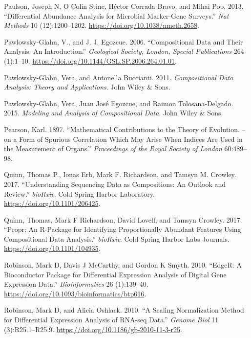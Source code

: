 \documentclass[onecolumn]{book}
\theoremstyle{definition}
\theoremstyle{definition}
\theoremstyle{definition}
\theoremstyle{remark}
\begin{document}
\leavevmode\hypertarget{ref-Paulson:2013aa}{}%
Paulson, Joseph N, O Colin Stine, Héctor Corrada Bravo, and Mihai Pop.
2013. ``Differential Abundance Analysis for Microbial Marker-Gene
Surveys.'' \emph{Nat Methods} 10 (12):1200--1202.
\url{https://doi.org/10.1038/nmeth.2658}.

\leavevmode\hypertarget{ref-Pawlowsky-Glahn:2006}{}%
Pawlowsky-Glahn, V., and J. J. Egozcue. 2006. ``Compositional Data and
Their Analysis: An Introduction.'' \emph{Geological Society, London,
Special Publications} 264 (1):1--10.
\url{https://doi.org/10.1144/GSL.SP.2006.264.01.01}.

\leavevmode\hypertarget{ref-pawlowsky2011compositional}{}%
Pawlowsky-Glahn, Vera, and Antonella Buccianti. 2011.
\emph{Compositional Data Analysis: Theory and Applications}. John Wiley
\& Sons.

\leavevmode\hypertarget{ref-pawlowsky2015modeling}{}%
Pawlowsky-Glahn, Vera, Juan José Egozcue, and Raimon Tolosana-Delgado.
2015. \emph{Modeling and Analysis of Compositional Data}. John Wiley \&
Sons.

\leavevmode\hypertarget{ref-Pearson:1896}{}%
Pearson, Karl. 1897. ``Mathematical Contributions to the Theory of
Evolution. -- on a Form of Spurious Correlation Which May Arise When
Indices Are Used in the Measurement of Organs.'' \emph{Proceedings of
the Royal Society of London} 60:489--98.

\leavevmode\hypertarget{ref-Quinn206425}{}%
Quinn, Thomas P., Ionas Erb, Mark F. Richardson, and Tamsyn M. Crowley.
2017. ``Understanding Sequencing Data as Compositions: An Outlook and
Review.'' \emph{bioRxiv}. Cold Spring Harbor Laboratory.
\url{https://doi.org/10.1101/206425}.

\leavevmode\hypertarget{ref-Quinn:2017}{}%
Quinn, Thomas, Mark F Richardson, David Lovell, and Tamsyn Crowley.
2017. ``Propr: An R-Package for Identifying Proportionally Abundant
Features Using Compositional Data Analysis.'' \emph{bioRxiv}. Cold
Spring Harbor Labs Journals. \url{https://doi.org/10.1101/104935}.

\leavevmode\hypertarget{ref-Robinson:2010}{}%
Robinson, Mark D, Davis J McCarthy, and Gordon K Smyth. 2010. ``EdgeR: A
Bioconductor Package for Differential Expression Analysis of Digital
Gene Expression Data.'' \emph{Bioinformatics} 26 (1):139--40.
\url{https://doi.org/10.1093/bioinformatics/btp616}.

\leavevmode\hypertarget{ref-Robinson:2010a}{}%
Robinson, Mark D, and Alicia Oshlack. 2010. ``A Scaling Normalization
Method for Differential Expression Analysis of RNA-seq Data.''
\emph{Genome Biol} 11 (3):R25.1--R25.9.
\url{https://doi.org/10.1186/gb-2010-11-3-r25}.
\end{document}
